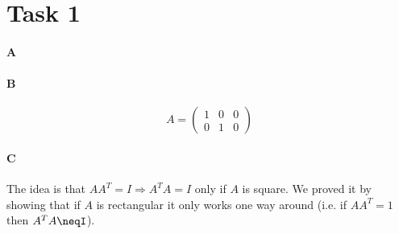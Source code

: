 \documentclass[12pt]{article}
\begin{document}
\maketitle

\section{Task 1}

\paragraph{A}

\paragraph{B}
\begin{equation}
A = \left( \begin{array}{ccc} 1 & 0 & 0 \\ 0 & 1 & 0 \end{array} \right)
\end{equation}

\paragraph{C}
The idea is that $AA^T = I \Rightarrow A^TA=I$ only if $A$ is square. We proved it by showing that if $A$ is rectangular it only works one way around (i.e. if $AA^T=1$ then $A^TA\neqI$).
\end{document}
